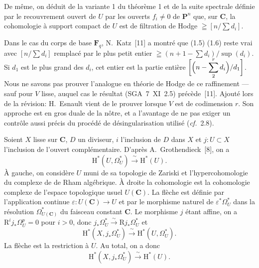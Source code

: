 \documentclass[12pt,a4paper]{article}
\theoremstyle{plain}
\theoremstyle{definition}
\begin{document}
De même, on déduit de la variante 1 du théorème 1 et de la suite spectrale définie par le recouvrement ouvert de $U$ par les ouverts $f_i \neq 0$ de $\mathbf{P}^n$ que, sur $\mathbf{C}$, la cohomologie à support compact de $U$ est de filtration de Hodge $\geqq [n/\sum d_i]$.

Dans le cas du corps de base $\mathbf{F}_q$, N.~Katz~[11] a montré que (1.5) (1.6) reste vrai avec $[n/\sum d_i]$ remplacé par le plus petit entier $\geqq (n+1-\sum d_i)/\sup(d_i)$. Si $d_1$ est le plus grand des $d_i$, cet entier est la partie entière $\biggl[\Bigl(n-\displaystyle\sum_2^r d_i\Bigr)/d_1\biggr]$. Nous ne savons pas prouver l'analogue en théorie de Hodge de ce raffinement --- sauf pour $V$ lisse, auquel cas le résultat (SGA~7~XI~2.5) précède~[11]. Ajouté lors de la révision: H.~Esnault vient de le prouver lorsque $V$ est de codimension $r$. Son approche est en gros duale de la nôtre, et a l'avantage de ne pas exiger un contrôle aussi précis du procédé de désingularisation utilisé (\textit{cf.}~2.8).

\medskip

Soient $X$ lisse sur $\mathbf{C}$, $D$ un diviseur, $i$ l'inclusion de $D$ dans $X$ et $j : U \subset X$ l'inclusion de l'ouvert complémentaire. D'après A.\ Grothendieck~[8], on a
\begin{equation}\label{eq:1.7}
\mathrm{H}^*(U, \Omega_U^*) \xrightarrow{\;\sim\;} \mathrm{H}^*(U).
\tag{1.7}
\end{equation}
À gauche, on considère $U$ muni de sa topologie de Zariski et l'hypercohomologie du complexe de de Rham algébrique. À droite la cohomologie est la cohomologie complexe de l'espace topologique usuel $U(\mathbf{C})$. La flèche est définie par l'application continue $\varepsilon : U(\mathbf{C}) \to U$ et par le morphisme naturel de $\varepsilon^* \Omega_U^*$ dans la résolution $\Omega_{U(\mathbf{C})}^*$ du faisceau constant $\mathbf{C}$. Le morphisme $j$ étant affine, on a $\mathrm{R}^i j_* \Omega_U^p = 0$ pour $i > 0$, donc $j_* \Omega_U^* \xrightarrow{\;\sim\;} \mathrm{R}j_* \Omega_U^*$ et
\begin{equation}\label{eq:1.8}
\mathrm{H}^*(X, j_* \Omega_U^*) \xrightarrow{\;\sim\;} \mathrm{H}^*(U, \Omega_U^*).
\tag{1.8}
\end{equation}
La flèche est la restriction à $U$. Au total, on a donc
\begin{equation}\label{eq:1.9}
\mathrm{H}^*(X, j_* \Omega_U^*) \xrightarrow{\;\sim\;} \mathrm{H}^*(U).
\tag{1.9}
\end{equation}
\end{document}
